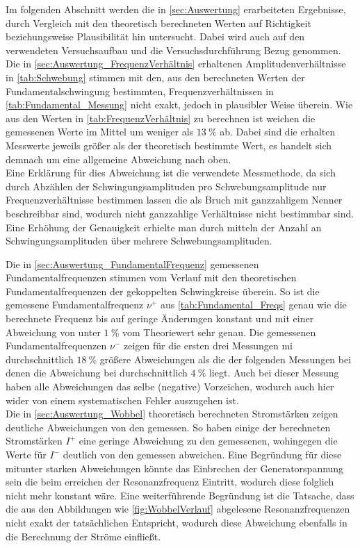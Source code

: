 Im folgenden Abschnitt werden die in \cref{sec:Auswertung} erarbeiteten Ergebnisse,
durch Vergleich mit den theoretisch berechneten Werten auf Richtigkeit beziehungsweise
Plausibilität hin untersucht. Dabei wird auch auf den verwendeten Versuchsaufbau und die 
Versuchsdurchführung Bezug genommen.\\

Die in \cref{sec:Auswertung_FrequenzVerhältnis} erhaltenen Amplitudenverhältnisse in \cref{tab:Schwebung} 
stimmen mit den, aus den berechneten Werten der Fundamentalschwingung bestimmten, Frequenzverhältnissen
in \cref{tab:Fundamental_Messung} nicht exakt, jedoch in plausibler Weise überein. Wie aus den Werten in 
\cref{tab:FrequenzVerhältnis} zu berechnen ist weichen die gemessenen Werte im Mittel um weniger als
$\SI{13}{\percent}$ ab. Dabei sind die erhalten Messwerte jeweils größer als der theoretisch bestimmte 
Wert, es handelt sich demnach um eine allgemeine Abweichung nach oben.\\
Eine Erklärung für dies Abweichung ist die verwendete Messmethode, da sich durch Abzählen der Schwingungsamplituden
pro Schwebungsamplitude nur Frequenzverhältnisse bestimmen lassen die als Bruch mit ganzzahligem Nenner beschreibbar
sind, wodurch nicht ganzzahlige Verhältnisse nicht bestimmbar sind. Eine Erhöhung der Genauigkeit erhielte man durch 
mitteln der Anzahl an Schwingungsamplituden über mehrere Schwebungsamplituden.   
     
Die in \cref{sec:Auswertung_FundamentalFrequenz} gemessenen Fundamentalfrequenzen stimmen vom Verlauf mit den 
theoretischen Fundamentalfrequenzen der gekoppelten Schwingkreise überein. So ist die gemessene Fundamentalfrequenz
$\nu^{+}$  aus \cref{tab:Fundamental_Freqs} genau wie die berechnete Frequenz bis auf geringe Änderungen 
konstant und mit einer Abweichung von unter $\SI{1}{\percent}$ vom Theoriewert sehr genau. 
Die gemessenen Fundamentalfrequenzen $\nu^{-}$ zeigen für die ersten drei Messungen mi durchschnittlich $\SI{18}{\percent}$
größere Abweichungen als die der folgenden Messungen bei denen die Abweichung bei durchschnittlich $\SI{4}{\percent}$
liegt. Auch bei dieser Messung haben alle Abweichungen das selbe (negative) Vorzeichen, wodurch auch hier wider
von einem systematischen Fehler auszugehen ist.\\
Die in \cref{sec:Auswertung_Wobbel} theoretisch berechneten Stromstärken zeigen deutliche Abweichungen von den
gemessen. So haben einige der berechneten Stromstärken $I^{+}$ eine geringe Abweichung zu den gemessenen,
wohingegen die Werte für $I^{-}$ deutlich von den gemessen abweichen. Eine Begründung für diese mitunter
starken Abweichungen könnte das Einbrechen der Generatorspannung sein die beim erreichen der Resonanzfrequenz
Eintritt, wodurch diese folglich nicht mehr konstant wäre. Eine weiterführende Begründung ist die Tatsache, dass
die aus den Abbildungen wie \ref{fig:WobbelVerlauf} abgelesene Resonanzfrequenzen nicht exakt der 
tatsächlichen Entspricht, wodurch diese Abweichung ebenfalls in die Berechnung der Ströme einfließt.

              